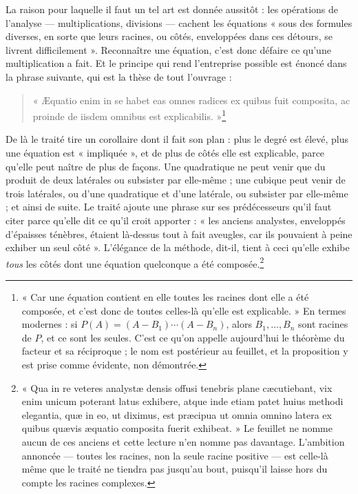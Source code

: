 \documentclass[11pt,a4paper]{article}
\begin{document}
La raison pour laquelle il faut un tel art est donnée aussitôt : les opérations
de l'analyse — multiplications, divisions — cachent les équations « sous des
formules diverses, en sorte que leurs racines, ou côtés, enveloppées dans ces
détours, se livrent difficilement ». Reconnaître une équation, c'est donc
défaire ce qu'une multiplication a fait. Et le principe qui rend l'entreprise
possible est énoncé dans la phrase suivante, qui est la thèse de tout
l'ouvrage :

\begin{quote}
« Æquatio enim in se habet eas omnes radices ex quibus fuit composita, ac
proinde de iisdem omnibus est explicabilis. »\footnote{« Car une équation
contient en elle toutes les racines dont elle a été composée, et c'est donc de
toutes celles-là qu'elle est explicable. » En termes modernes : si
$P(A) = (A - B_1)\cdots(A - B_n)$, alors $B_1, \dots, B_n$ sont racines de $P$,
et ce sont les seules. C'est ce qu'on appelle aujourd'hui le théorème du facteur
et sa réciproque ; le nom est postérieur au feuillet, et la proposition y est
prise comme évidente, non démontrée.}
\end{quote}

De là le traité tire un corollaire dont il fait son plan : plus le degré est
élevé, plus une équation est « impliquée », et de plus de côtés elle est
explicable, parce qu'elle peut naître de plus de façons. Une quadratique ne peut
venir que du produit de deux latérales ou subsister par elle-même ; une cubique
peut venir de trois latérales, ou d'une quadratique et d'une latérale, ou
subsister par elle-même ; et ainsi de suite. Le traité ajoute une phrase sur ses
prédécesseurs qu'il faut citer parce qu'elle dit ce qu'il croit apporter : « les
anciens analystes, enveloppés d'épaisses ténèbres, étaient là-dessus tout à fait
aveugles, car ils pouvaient à peine exhiber un seul côté ». L'élégance de la
méthode, dit-il, tient à ceci qu'elle exhibe \emph{tous} les côtés dont une
équation quelconque a été composée.\footnote{« Qua in re veteres analystæ densis
offusi tenebris plane cæcutiebant, vix enim unicum poterant latus exhibere,
atque inde etiam patet huius methodi elegantia, quæ in eo, ut diximus, est
præcipua ut omnia omnino latera ex quibus quævis æquatio composita fuerit
exhibeat. » Le feuillet ne nomme aucun de ces anciens et cette lecture n'en
nomme pas davantage. L'ambition annoncée — toutes les racines, non la seule
racine positive — est celle-là même que le traité ne tiendra pas jusqu'au bout,
puisqu'il laisse hors du compte les racines complexes.}
\end{document}
